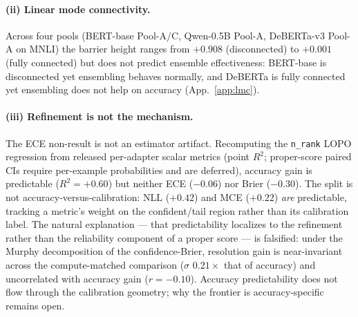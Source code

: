 \documentclass[11pt]{article}
\begin{document}
\paragraph{(ii) Linear mode connectivity.} Across four pools (BERT-base Pool-A/C, Qwen-0.5B Pool-A, DeBERTa-v3 Pool-A on MNLI) the barrier height ranges from $+0.908$ (disconnected) to $+0.001$ (fully connected) but does not predict ensemble effectiveness: BERT-base is disconnected yet ensembling behaves normally, and DeBERTa is fully connected yet ensembling does not help on accuracy (App.~\ref{app:lmc}).

\paragraph{(iii) Refinement is not the mechanism.} The ECE non-result is not an estimator artifact. Recomputing the \texttt{n\_rank} LOPO regression from released per-adapter scalar metrics (point $R^2$; proper-score paired CIs require per-example probabilities and are deferred), accuracy gain is predictable ($R^2{=}{+}0.60$) but neither ECE ($-0.06$) nor Brier ($-0.30$). The split is not accuracy-versus-calibration: NLL ($+0.42$) and MCE ($+0.22$) \emph{are} predictable, tracking a metric's weight on the confident/tail region rather than its calibration label. The natural explanation --- that predictability localizes to the refinement rather than the reliability component of a proper score --- is falsified: under the Murphy decomposition of the confidence-Brier, resolution gain is near-invariant across the compute-matched comparison ($\sigma$ $0.21{\times}$ that of accuracy) and uncorrelated with accuracy gain ($r{=}{-}0.10$). Accuracy predictability does not flow through the calibration geometry; why the frontier is accuracy-specific remains open.
\end{document}
